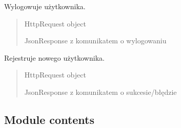 \documentclass[letterpaper,11pt,polish]{sphinxmanual}
\begin{document}

\begin{fulllineitems}
\label{\detokenize{mainApp:mainApp.views.logout_view}}
\pysigstartsignatures
{}
\pysigstopsignatures
\sphinxAtStartPar
Wylogowuje użytkownika.
\begin{quote}\begin{description}
\sphinxAtStartPar
{} \textendash{} HttpRequest object

\sphinxAtStartPar
JsonResponse z komunikatem o wylogowaniu

\end{description}\end{quote}

\end{fulllineitems}


\begin{fulllineitems}
\label{\detokenize{mainApp:mainApp.views.register_view}}
\pysigstartsignatures
{}
\pysigstopsignatures
\sphinxAtStartPar
Rejestruje nowego użytkownika.
\begin{quote}\begin{description}
\sphinxAtStartPar
{} \textendash{} HttpRequest object

\sphinxAtStartPar
JsonResponse z komunikatem o sukcesie/błędzie

\end{description}\end{quote}

\end{fulllineitems}



\subsection{Module contents}
\label{\detokenize{mainApp:module-mainApp}}\label{\detokenize{mainApp:module-contents}}
\sphinxstepscope
\end{document}
